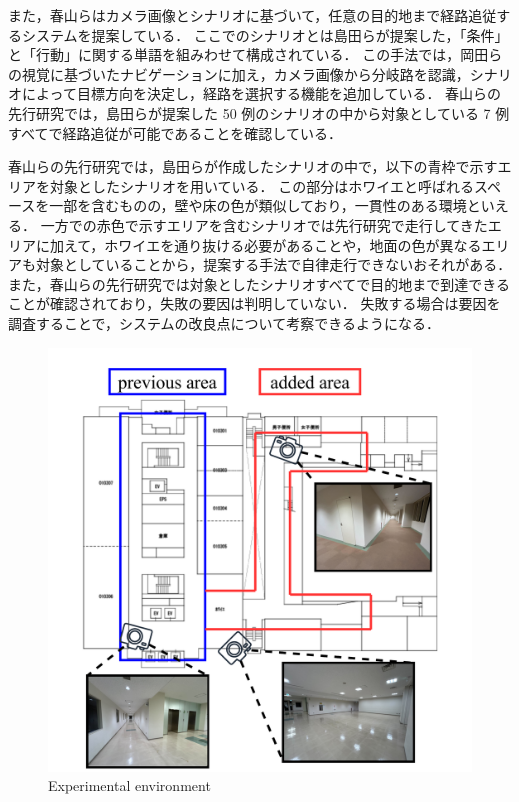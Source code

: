 また，春山らはカメラ画像とシナリオに基づいて，任意の目的地まで経路追従するシステムを提案している．
ここでのシナリオとは島田らが提案した，「条件」と「行動」に関する単語を組みわせて構成されている．
この手法では，岡田らの視覚に基づいたナビゲーションに加え，カメラ画像から分岐路を認識，シナリオによって目標方向を決定し，経路を選択する機能を追加している．
春山らの先行研究では，島田らが提案した 50 例のシナリオの中から対象としている 7 例すべてで経路追従が可能であることを確認している．

春山らの先行研究では，島田らが作成したシナリオの中で，以下の青枠で示すエリアを対象としたシナリオを用いている．
この部分はホワイエと呼ばれるスペースを一部を含むものの，壁や床の色が類似しており，一貫性のある環境といえる．
一方での赤色で示すエリアを含むシナリオでは先行研究で走行してきたエリアに加えて，ホワイエを通り抜ける必要があることや，地面の色が異なるエリアも対象としていることから，提案する手法で自律走行できないおそれがある．
また，春山らの先行研究では対象としたシナリオすべてで目的地まで到達できることが確認されており，失敗の要因は判明していない．
失敗する場合は要因を調査することで，システムの改良点について考察できるようになる．

\begin{figure}[htbp]
     \centering
     \includegraphics[width=130mm]{images/pdf/ishiguro/cit3f.pdf}
     \caption{Experimental environment}
     \label{fig:cit3f}
\end{figure}

\newpage
